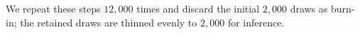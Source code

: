 \begin{enumerate}
\end{enumerate}
We repeat these steps $12,000$ times and discard the initial $2,000$ draws as burn-in; the retained draws are thinned evenly to $2,000$ for inference. 

